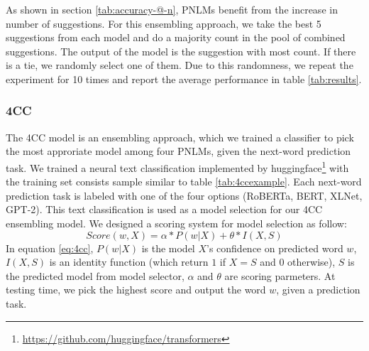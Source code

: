 \documentclass[11pt]{article}
\begin{document}
As shown in section \ref{tab:accuracy-@-n}, PNLMs benefit from the increase in number of suggestions. For this ensembling approach, we take the best 5 suggestions from each model and do a majority count in the pool of combined suggestions. The output of the model is the suggestion with most count. If there is a tie, we randomly select one of them. Due to this randomness, we repeat the experiment for 10 times and report the average performance in table \ref{tab:results}.

\subsubsection{4CC} \label{sec:4cc}

The 4CC model is an ensembling approach, which we trained a classifier to pick the most approriate model among four PNLMs, given the next-word prediction task. We trained a neural text classification implemented by huggingface\footnote{\url{https://github.com/huggingface/transformers}} with the training set consists sample similar to table \ref{tab:4ccexample}. Each next-word prediction task is labeled with one of the four options (RoBERTa, BERT, XLNet, GPT-2). This text classification is used as a model selection for our 4CC ensembling model. We designed a scoring system for model selection as follow:
\begin{equation} \label{eq:4cc}
	Score(w, X) = \alpha * P(w|X) + \theta * I (X, S)
\end{equation}
In equation \ref{eq:4cc}, $P(w|X)$ is the model $X$'s confidence on predicted word $w$, $I(X, S)$ is an identity function (which return $1$ if $X = S$ and $0$ otherwise), $S$ is the predicted model from model selector, $\alpha$ and $\theta$ are scoring parmeters.  
At testing time, we pick the highest score and output the word $w$, given a prediction task.  

\begin{table}
    \centering
    \caption{An example of tranining data for the 4CC model. Class can be one of the four option: RoBERTa, BERT, XLNet, GPT-2}
    \label{tab:4ccexample}
\end{table}
\end{document}
